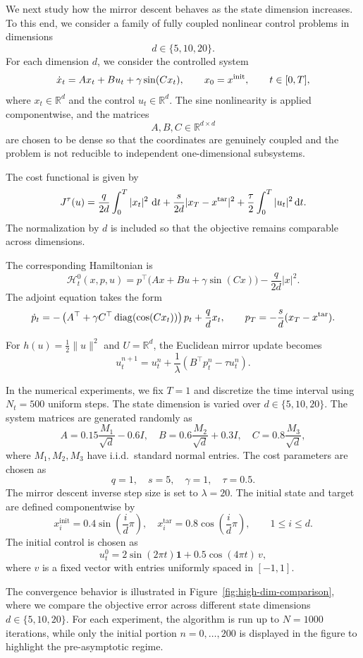 \documentclass[11pt]{amsart}
\theoremstyle{plain}
\theoremstyle{definition}
\theoremstyle{remark}
\newcommand{\dd}{\,\mathrm{d}}
\begin{document}
We next study how the mirror descent behaves as the state dimension increases. To this end, we consider a family of fully coupled nonlinear
control problems in dimensions
\[
d\in\{5,10,20\}.
\]
For each dimension $d$, we consider the controlled system
\[
\dot x_t = A x_t + B u_t + \gamma \sin(Cx_t),
\qquad
x_0=x^{\rm init},
\qquad
t\in[0,T],
\]
where $x_t\in\mathbb R^d$ and the control $u_t\in\mathbb R^d$. The sine nonlinearity is applied componentwise, and the matrices
\[
A,B,C\in\mathbb R^{d\times d}
\]
are chosen to be dense so that the coordinates are genuinely coupled and the
problem is not reducible to independent one-dimensional subsystems.

The cost functional is given by
\[
J^\tau(u)
=
\frac{q}{2d} \int_0^T
|x_t|^2 \,\dd t
+
\frac{s}{2d}|x_T-x^{\rm tar}|^2
+
\frac{\tau}{2} \int_0^T |u_t|^2\dd t.
\]
The normalization by $d$ is included so that the objective remains comparable across dimensions.

The corresponding Hamiltonian is
\[
\mathcal H_t^0(x,p,u)
=
p^\top\bigl(Ax+Bu+\gamma\sin(C x)\bigr)
-
\frac{q}{2d}|x|^2.
\]
The adjoint equation takes the form
\[
\dot p_t
=
-
\left(
A^\top
+
\gamma C^\top \operatorname{diag}(\cos(Cx_t))
\right)p_t
+
\frac{q}{d}x_t,
\qquad
p_T
=
-\frac{s}{d}(x_T-x^{\rm tar}).
\]

For $h(u)=\frac12\|u\|^2$ and $U=\mathbb R^d$, the Euclidean mirror update becomes
\[
u_t^{n+1}
=
u_t^n
+
\frac1\lambda
\left(
B^\top p_t^n
-
\tau u_t^n
\right).
\]

In the numerical experiments, we fix $T=1$ and discretize the time interval using $N_t=500$ uniform steps. The state dimension is varied over $d\in\{5,10,20\}$. The system matrices are generated randomly as
\[
A = 0.15 \frac{M_1}{\sqrt{d}} - 0.6 I,
\quad
B = 0.6 \frac{M_2}{\sqrt{d}} + 0.3 I,
\quad
C = 0.8 \frac{M_3}{\sqrt{d}},
\]
where $M_1, M_2, M_3$ have i.i.d.\ standard normal entries. The cost parameters are chosen as
\[
q = 1, \quad s = 5, \quad \gamma =1, \quad \tau = 0.5.
\]
The mirror descent inverse step size is set to $\lambda=20$. The initial state and target are defined componentwise by
\[
x^{\mathrm{init}}_i = 0.4\sin\left(\frac{i}{d}\pi\right),
\quad
x^{\mathrm{tar}}_i = 0.8\cos\left(\frac{i}{d}\pi\right), \qquad 1 \leq i \leq d.
\]
The initial control is chosen as
\[
u_t^0 = 2\sin(2\pi t)\mathbf{1}
+ 0.5\cos(4\pi t)\,v,
\]
where $v$ is a fixed vector with entries uniformly spaced in $[-1,1]$.

The convergence behavior is illustrated in Figure~\ref{fig:high-dim-comparison}, where we compare the objective error across different state dimensions $d \in \{5,10,20\}$. For each experiment, the algorithm is run up to $N=1000$ iterations, while only the initial portion $n=0,\dots,200$ is displayed in the figure to highlight the pre-asymptotic regime.
\end{document}

